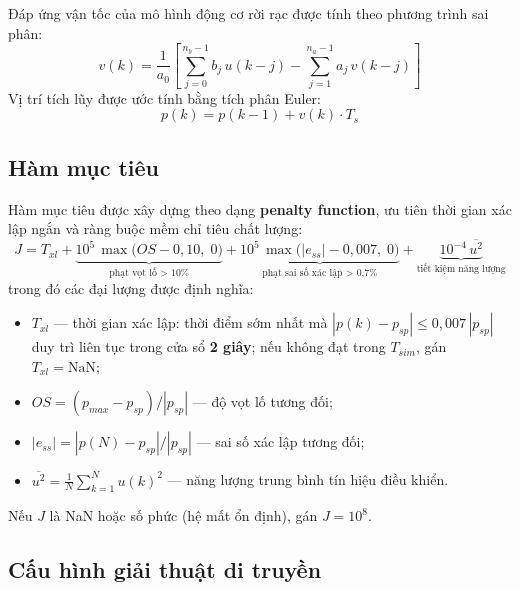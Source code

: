 Đáp ứng vận tốc của mô hình động cơ rời rạc được tính theo phương trình
sai phân:
\begin{equation}
    v(k) = \frac{1}{a_0}\!\left[
             \sum_{j=0}^{n_b-1} b_j\,u(k{-}j)
           - \sum_{j=1}^{n_a-1} a_j\,v(k{-}j)
           \right]
    \label{eq:discrete_plant}
\end{equation}
Vị trí tích lũy được ước tính bằng tích phân Euler:
\begin{equation}
    p(k) = p(k{-}1) + v(k)\cdot T_s
    \label{eq:pos_euler}
\end{equation}

\subsection{Hàm mục tiêu}

Hàm mục tiêu được xây dựng theo dạng \textbf{penalty function}, ưu tiên
thời gian xác lập ngắn và ràng buộc mềm chỉ tiêu chất lượng:
\begin{equation}
    J =
    T_{xl}
    + \underbrace{10^5\,\max\!\bigl(OS - 0{,}10,\;0\bigr)}_{\text{phạt vọt lố > 10\%}}
    + \underbrace{10^5\,\max\!\bigl(|e_{ss}| - 0{,}007,\;0\bigr)}_{\text{phạt sai số xác lập > 0,7\%}}
    + \underbrace{10^{-4}\,\overline{u^2}}_{\text{tiết kiệm năng lượng}}
    \label{eq:ga_objective}
\end{equation}
trong đó các đại lượng được định nghĩa:
\begin{itemize}
    \item $T_{xl}$ — thời gian xác lập: thời điểm sớm nhất mà
    $|p(k) - p_{sp}| \leq 0{,}007\,|p_{sp}|$ duy trì liên tục trong cửa sổ
    \textbf{2 giây}; nếu không đạt trong $T_{sim}$, gán $T_{xl} = \text{NaN}$;
    \item $OS = (p_{max} - p_{sp})/|p_{sp}|$ — độ vọt lố tương đối;
    \item $|e_{ss}| = |p(N) - p_{sp}|/|p_{sp}|$ — sai số xác lập tương đối;
    \item $\overline{u^2} = \frac{1}{N}\sum_{k=1}^{N}u(k)^2$ — năng lượng trung
    bình tín hiệu điều khiển.
\end{itemize}
Nếu $J$ là NaN hoặc số phức (hệ mất ổn định), gán $J = 10^8$.

\subsection{Cấu hình giải thuật di truyền}

